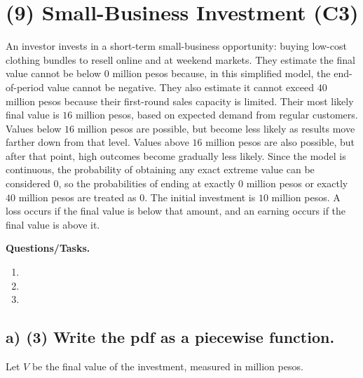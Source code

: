 	


	
	\section{(9) Small-Business Investment (C3)}
	\label{sec:small-business-investment-c3}
	
	An investor invests in a short-term small-business opportunity: buying low-cost clothing bundles to resell online and at weekend markets. They estimate the final value cannot be below $0$ million pesos because, in this simplified model, the end-of-period value cannot be negative. They also estimate it cannot exceed $40$ million pesos because their first-round sales capacity is limited. Their most likely final value is $16$ million pesos, based on expected demand from regular customers. Values below $16$ million pesos are possible, but become less likely as results move farther down from that level. Values above $16$ million pesos are also possible, but after that point, high outcomes become gradually less likely. Since the model is continuous, the probability of obtaining any exact extreme value can be considered $0$, so the probabilities of ending at exactly $0$ million pesos or exactly $40$ million pesos are treated as $0$. The initial investment is $10$ million pesos. A loss occurs if the final value is below that amount, and an earning occurs if the final value is above it.
	
	\textbf{Questions/Tasks.}
	\begin{enumerate}[label=\textbf{\alph*)}]
		\item {}
		\item {}
		\item {}
	\end{enumerate}
	
	\subsection*{a) \textbf{(3)} Write the pdf as a piecewise function.}
	\label{subsec:small-business-investment-c3-a}
	Let $V$ be the final value of the investment, measured in million pesos.
	
